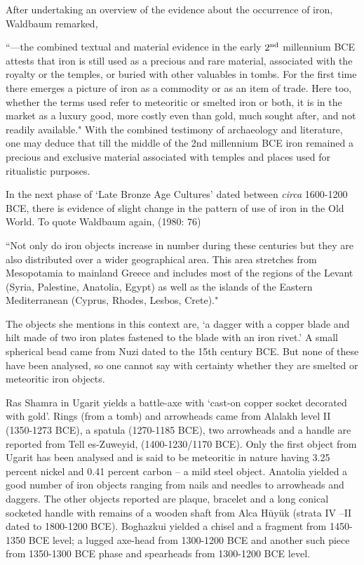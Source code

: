 {After undertaking an overview of the evidence about the occurrence of iron, Waldbaum remarked, 

{\footnotesize ``---the combined textual and material evidence in the early $2^{\rm nd}$ millennium BCE attests that iron is still used as a precious and rare material, associated with the royalty or the temples, or buried with other valuables in tombs. For the first time there emerges a picture of iron as a commodity or as an item of trade. Here too, whether the terms used refer to meteoritic or smelted iron or both, it is in the market as a luxury good, more costly even than gold, much sought after, and not readily available."} With the combined testimony of archaeology and literature, one may deduce that till the middle of the 2nd millennium BCE iron remained a precious and exclusive material associated with temples and places used for ritualistic purposes.

In the next phase of `Late Bronze Age Cultures’ dated  between \textit{circa} 1600-1200 BCE, there is evidence of slight change in the pattern of use of iron in the Old World. To quote Waldbaum again, (1980: 76)

{\footnotesize ``Not only do iron objects increase in number during these centuries but they are also distributed over a wider geographical area. This area stretches from Mesopotamia to mainland Greece and includes most of the regions of the Levant (Syria, Palestine, Anatolia, Egypt) as well as the islands of the Eastern Mediterranean (Cyprus, Rhodes, Lesbos, Crete)."}

The objects she mentions in this context are, `a dagger with a copper blade and hilt made of two iron plates fastened to the blade with an iron rivet.' A small spherical bead came from Nuzi dated to the 15th century BCE. But none of these have been analysed, so one cannot say with certainty whether they are smelted or meteoritic iron objects.

Ras Shamra in Ugarit yields a battle-axe with `cast-on copper socket decorated with gold'. Rings (from a tomb) and arrowheads came from Alalakh level II (1350-1273 BCE), a spatula (1270-1185 BCE), two arrowheads and a handle are reported from Tell es-Zuweyid, (1400-1230/1170 BCE). Only the first object from Ugarit has been analysed and is said to be meteoritic in nature having 3.25 percent nickel and 0.41 percent carbon – a mild steel object. Anatolia yielded a good number of iron objects ranging from nails and needles to arrowheads and daggers. The other objects reported are plaque, bracelet and a long conical socketed handle with remains of a wooden shaft from Alca Hüyük (strata IV –II dated to 1800-1200 BCE). Boghazkui yielded a chisel and a fragment from 1450-1350 BCE level; a lugged axe-head from 1300-1200 BCE and another such piece from 1350-1300 BCE phase and spearheads from 1300-1200 BCE level.

}
